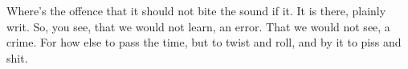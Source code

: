 

Where's the offence that it should not bite the sound if it.  It is
there, plainly writ.  So, you see, that we would not learn, an error.
That we would not see, a crime.  For how else to pass the time, but to
twist and roll, and by it to piss and shit.

\bye
